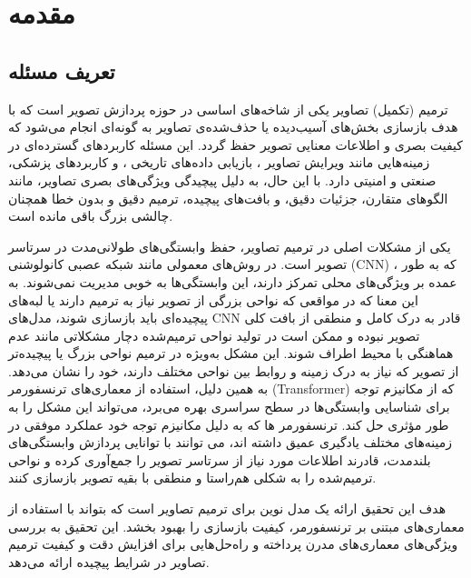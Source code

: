 \chapter{مقدمه}
\section{تعریف مسئله}

ترمیم (تکمیل) تصاویر 
یکی از شاخه‌های اساسی در حوزه پردازش تصویر است که با هدف بازسازی بخش‌های آسیب‌دیده یا حذف‌شده‌ی تصاویر به گونه‌ای انجام می‌شود که کیفیت بصری و اطلاعات معنایی تصویر حفظ گردد. این مسئله کاربردهای گسترده‌ای در زمینه‌هایی مانند ویرایش تصاویر 
\cite{joSCFEGANFaceEditing2019}
، بازیابی داده‌های تاریخی %
\cite{wanBringingOldPhotos2020, wanOldPhotoRestoration2020}%
، و کاربردهای پزشکی، صنعتی و امنیتی دارد. با این حال، به دلیل پیچیدگی ویژگی‌های بصری تصاویر، مانند الگوهای متقارن، جزئیات دقیق، و بافت‌های پیچیده، ترمیم دقیق و بدون خطا همچنان چالشی بزرگ باقی مانده است.

یکی از مشکلات اصلی در ترمیم تصاویر، حفظ وابستگی‌های طولانی‌مدت در سرتاسر تصویر است. در روش‌های معمولی مانند شبکه عصبی کانولوشنی (CNN)
\cite{laubeImageInpaintingHighResolution2018}%
، که به طور عمده بر ویژگی‌های محلی تمرکز دارند، این وابستگی‌ها به خوبی مدیریت نمی‌شوند. به این معنا که در مواقعی که نواحی بزرگی از تصویر نیاز به ترمیم دارند یا لبه‌های پیچیده‌ای باید بازسازی شوند، مدل‌های CNN قادر به درک کامل و منطقی از بافت کلی تصویر نبوده و ممکن است در تولید نواحی ترمیم‌شده دچار مشکلاتی مانند عدم هماهنگی با محیط اطراف شوند. این مشکل به‌ویژه در ترمیم نواحی بزرگ یا پیچیده‌تر از تصویر که نیاز به درک زمینه و روابط بین نواحی مختلف دارند، خود را نشان می‌دهد. به همین دلیل، استفاده از معماری‌های ترنسفورمر (Transformer)
\cite{vaswaniAttentionAllYou2023}
که از مکانیزم توجه
\cite{bahdanauNeuralMachineTranslation2016}
 برای شناسایی وابستگی‌ها در سطح سراسری بهره می‌برد، می‌تواند این مشکل را به طور مؤثری حل کند. ترنسفورمر ها  که به دلیل مکانیزم توجه خود عملکرد موفقی در زمینه‌های مختلف یادگیری عمیق داشته اند، می توانند با توانایی پردازش وابستگی‌های بلندمدت، قادرند اطلاعات مورد نیاز از سرتاسر تصویر را جمع‌آوری کرده و نواحی ترمیم‌شده را به شکلی هم‌راستا و منطقی با بقیه تصویر بازسازی کنند.

هدف این تحقیق ارائه یک مدل نوین برای ترمیم تصاویر است که بتواند با استفاده از معماری‌های مبتنی بر ترنسفورمر، کیفیت بازسازی را بهبود بخشد. این تحقیق به بررسی ویژگی‌های معماری‌های مدرن پرداخته و راه‌حل‌هایی برای افزایش دقت و کیفیت ترمیم تصاویر در شرایط پیچیده ارائه می‌دهد.


